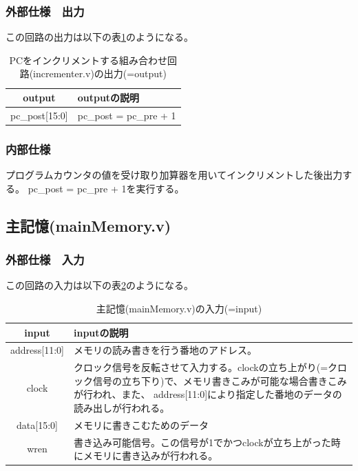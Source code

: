 \documentclass[a4j,titlepage]{jarticle}
\begin{document}
\subsubsection{外部仕様　出力}
この回路の出力は以下の表\ref{incrementerO}のようになる。
\begin{table}[H]
    \caption{PCをインクリメントする組み合わせ回路(incrementer.v)の出力(=output)}
    \label{incrementerO}
    \begin{center}
    \begin {tabularx}{150mm}{|c|X|} \hline
         output & outputの説明 \\ \hline \hline
         pc\_post[15:0] & pc\_post = pc\_pre + 1\\ \hline
    \end {tabularx}
    \end{center}
\end{table}

\subsubsection{内部仕様}
プログラムカウンタの値を受け取り加算器を用いてインクリメントした後出力する。
pc\_post = pc\_pre + 1を実行する。


\newpage
\subsection{主記憶(mainMemory.v)}

\subsubsection{外部仕様　入力}
この回路の入力は以下の表\ref{mainMemoryI}のようになる。
\begin{table}[H]
    \caption{主記憶(mainMemory.v)の入力(=input)}
    \label{mainMemoryI}
    \begin{center}
    \begin {tabularx}{150mm}{|c|X|} \hline
         input & inputの説明 \\ \hline \hline
         address[11:0] & メモリの読み書きを行う番地のアドレス。\\ \hline
         clock & クロック信号を反転させて入力する。clockの立ち上がり(=クロック信号の立ち下り)で、メモリ書きこみが可能な場合書きこみが行われ、また、
         address[11:0]により指定した番地のデータの読み出しが行われる。 \\ \hline 
         data[15:0] & メモリに書きこむためのデータ\\ \hline
         wren & 書き込み可能信号。この信号が1でかつclockが立ち上がった時にメモリに書き込みが行われる。\\ \hline
    \end{tabularx}
    \end{center}
\end{table}
\end{document}
